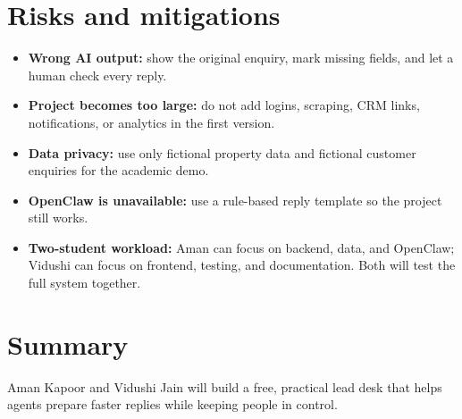 \documentclass[10pt,a4paper]{article}
\begin{document}
\section{Risks and mitigations}
\begin{itemize}
    \item \textbf{Wrong AI output:} show the original enquiry, mark missing fields, and let a human check every reply.
    \item \textbf{Project becomes too large:} do not add logins, scraping, CRM links, notifications, or analytics in the first version.
    \item \textbf{Data privacy:} use only fictional property data and fictional customer enquiries for the academic demo.
    \item \textbf{OpenClaw is unavailable:} use a rule-based reply template so the project still works.
    \item \textbf{Two-student workload:} Aman can focus on backend, data, and OpenClaw; Vidushi can focus on frontend, testing, and documentation. Both will test the full system together.
\end{itemize}

\section{Summary}
Aman Kapoor and Vidushi Jain will build a free, practical lead desk that helps agents prepare faster replies while keeping people in control.
\end{document}
